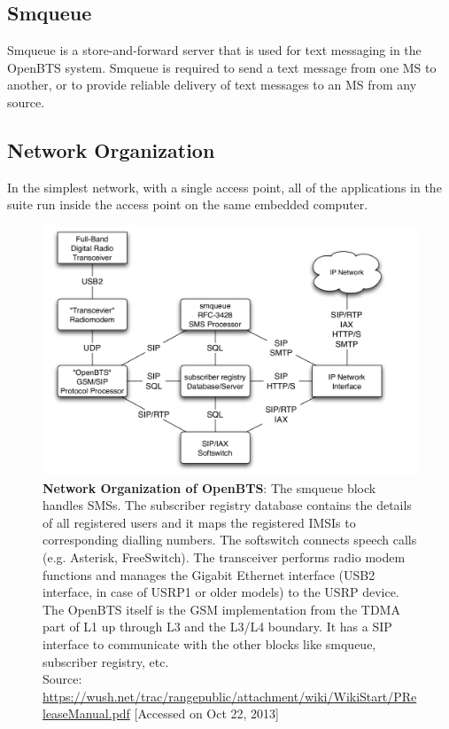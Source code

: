 \subsection{Smqueue}
Smqueue is a store-and-forward server that is used for text messaging in the OpenBTS system. Smqueue is required to send a text message from one MS to another, or to provide reliable delivery of text messages to an MS from any source.

\subsection{Network Organization}
In the simplest network, with a single access point, all of the applications in the suite run inside the access point on the same embedded computer.



\begin{figure}[h]
\centering
\includegraphics[width=1\textwidth]{networkOrg}
\caption[Network Organization of OpenBTS]{\textbf{Network Organization of OpenBTS}: The smqueue block handles SMSs.
The subscriber registry database contains the details of all registered users and it
maps the registered IMSIs to corresponding dialling numbers. The softswitch connects
speech calls (e.g. Asterisk, FreeSwitch). The transceiver performs radio modem
functions and manages the Gigabit Ethernet interface (USB2 interface, in case
of USRP1 or older models) to the USRP device. The OpenBTS itself is the GSM
implementation from the TDMA part of L1 up through L3 and the L3/L4 boundary.
It has a SIP interface to communicate with the other blocks like smqueue, subscriber
registry, etc. \\
\footnotesize{Source: \url{https://wush.net/trac/rangepublic/attachment/wiki/WikiStart/PReleaseManual.pdf} [Accessed on Oct 22, 2013]}
}
\label{networkOrg}
\end{figure}


